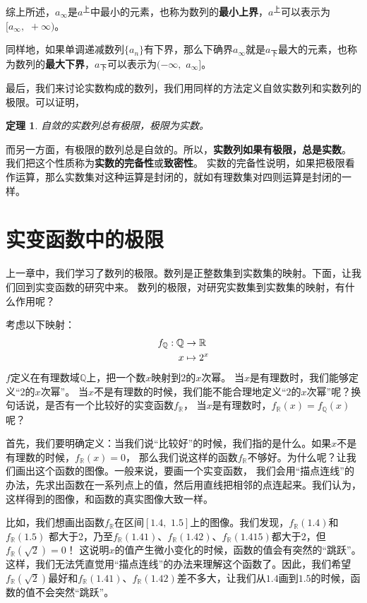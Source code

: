 \documentclass[12pt,UTF8]{ctexbook}
\newtheorem{tm}{定理}[section]
\begin{document}
综上所述，$a_\infty$是$a^{\text{上}}$中最小的元素，也称为数列的\textbf{最小上界}，$a^{\text{上}}$可以表示为$[a_\infty, \,\,+\infty)$。

同样地，如果单调递减数列$\{a_n\}$有下界，那么下确界$a_\infty$就是$a_{\text{下}}$最大的元素，也称为数列的\textbf{最大下界}，$a_{\text{下}}$可以表示为$(-\infty,\,\,a_\infty]$。 

最后，我们来讨论实数构成的数列，我们用同样的方法定义自敛实数列和实数列的极限。可以证明，
\begin{tm}
    自敛的实数列总有极限，极限为实数。
\end{tm}
而另一方面，有极限的数列总是自敛的。所以，\textbf{实数列如果有极限，总是实数}。
我们把这个性质称为\textbf{实数的完备性}或\textbf{致密性}。
实数的完备性说明，如果把极限看作运算，那么实数集对这种运算是封闭的，就如有理数集对四则运算是封闭的一样。

\chapter{实变函数中的极限}
上一章中，我们学习了数列的极限。数列是正整数集到实数集的映射。下面，让我们回到实变函数的研究中来。
数列的极限，对研究实数集到实数集的映射，有什么作用呢？

考虑以下映射：
\begin{align}
    f_{\mathbb{Q}}: \mathbb{Q} &\rightarrow \mathbb{R}\notag \\
    x &\mapsto 2^x \notag
\end{align}
$f$定义在有理数域$\mathbb{Q}$上，把一个数$x$映射到$2$的$x$次幂。
当$x$是有理数时，我们能够定义“$2$的$x$次幂”。
当$x$不是有理数的时候，我们能不能合理地定义“$2$的$x$次幂”呢？换句话说，是否有一个比较好的实变函数$f_{\mathbb{R}}$，
当$x$是有理数时，$f_{\mathbb{R}}(x) = f_{\mathbb{Q}}(x)$呢？

首先，我们要明确定义：当我们说“比较好”的时候，我们指的是什么。如果$x$不是有理数的时候，$f_{\mathbb{R}}(x) = 0$，
那么我们说这样的函数$f_{\mathbb{R}}$不够好。为什么呢？让我们画出这个函数的图像。一般来说，要画一个实变函数，
我们会用“描点连线”的办法，先求出函数在一系列点上的值，然后用直线把相邻的点连起来。我们认为，这样得到的图像，和函数的真实图像大致一样。

比如，我们想画出函数$f_{\mathbb{R}}$在区间$[1.4,\,\,1.5]$上的图像。我们发现，$f_{\mathbb{R}}(1.4)$和$f_{\mathbb{R}}(1.5)$
都大于2，乃至$f_{\mathbb{R}}(1.41)$、$f_{\mathbb{R}}(1.42)$、$f_{\mathbb{R}}(1.415)$都大于$2$，但$f_{\mathbb{R}}(\sqrt{2}) = 0$！
这说明$x$的值产生微小变化的时候，函数的值会有突然的“跳跃”。这样，我们无法凭直觉用“描点连线”的办法来理解这个函数了。因此，我们希望
$f_{\mathbb{R}}(\sqrt{2})$最好和$f_{\mathbb{R}}(1.41)$、$f_{\mathbb{R}}(1.42)$差不多大，让我们从$1.4$画到$1.5$的时候，函数的值不会突然“跳跃”。
\end{document}
